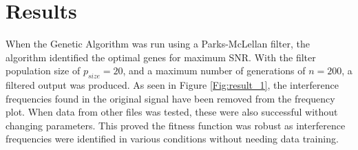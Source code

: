 \documentclass[a4paper, 11pt]{article}
\begin{document}
\section{Results}\label{sec:res}
    When the Genetic Algorithm was run using a Parks-McLellan filter, the algorithm identified the optimal genes for maximum SNR. 
    With the filter population size of $p_{size} = 20$, and a maximum number of generations of $n = 200$, a filtered 
    output was produced. As seen in Figure \ref{Fig:result_1}, the interference frequencies found in the original signal have 
    been removed from the frequency plot. When data from other files was tested, these were also successful without changing 
    parameters. This proved the fitness function was robust as interference frequencies were identified in various conditions
    without needing data training. 
    
\end{document}
